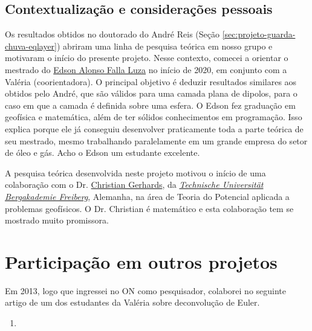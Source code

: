 \subsection*{Contextualização e considerações pessoais}

Os resultados obtidos no doutorado do André Reis 
(Seção \ref{sec:projeto-guarda-chuva-eqlayer}) abriram uma linha de pesquisa teórica
em nosso grupo e motivaram o início do presente projeto.
Nesse contexto, comecei a orientar o mestrado do
\href{https://lattes.cnpq.br/4225133150519568}{Edson Alonso Falla Luza} no início
de 2020, em conjunto com a Valéria (coorientadora).
O principal objetivo é deduzir resultados similares aos obtidos pelo André, que são válidos 
para uma camada plana de dipolos, para o caso em que a camada é definida sobre uma esfera.
O Edson fez graduação em geofísica e matemática, além de ter sólidos conhecimentos em 
programação. Isso explica porque ele já conseguiu desenvolver praticamente toda a
parte teórica de seu mestrado, mesmo trabalhando paralelamente em um grande empresa
do setor de óleo e gás. Acho o Edson um estudante excelente.

\bigskip

\noindent A pesquisa teórica desenvolvida neste projeto motivou o início de uma colaboração com o 
Dr. \href{https://tu-freiberg.de/en/fakult3/gy/mageo/members}{Christian Gerhards},
da \href{https://tu-freiberg.de/universitaet}{\textsl{Technische Universität Bergakademie Freiberg}}, Alemanha, na área de Teoria do Potencial aplicada a problemas geofísicos.
O Dr. Christian é matemático e esta colaboração tem se mostrado muito promissora.




\section{Participação em outros projetos} 
\label{sec:outros-projeto}

Em 2013, logo que ingressei no ON como pesquisador, colaborei no seguinte artigo de um dos
estudantes da Valéria sobre deconvolução de Euler.
\begin{enumerate}
	\item {}
\end{enumerate}

\bigskip

